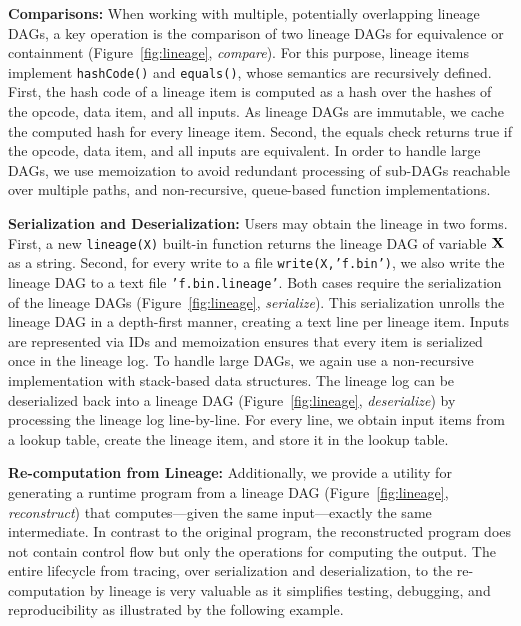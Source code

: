 \textbf{Comparisons:} When working with multiple, potentially overlapping lineage DAGs, a key operation is the comparison of two lineage DAGs for equivalence or containment (Figure~\ref{fig:lineage}, \emph{compare}). For this purpose, lineage items implement \texttt{hashCode()} and \texttt{equals()}, whose semantics are recursively defined. First, the hash code of a lineage item is computed as a hash over the hashes of the opcode, data item, and all inputs. As lineage DAGs are immutable, we cache the computed hash for every lineage item. Second, the equals check returns true if the opcode, data item, and all inputs are equivalent. In order to handle large DAGs, we use memoization to avoid redundant processing of sub-DAGs reachable over multiple paths, and non-recursive, queue-based function implementations.  

\textbf{Serialization and Deserialization:} Users may obtain the lineage in two forms. First, a new \texttt{lineage(X)} built-in function returns the lineage DAG of variable $\mathbf{X}$ as a string. Second, for every write to a file \texttt{write(X,'f.bin')}, we also write the lineage DAG to a text file \texttt{'f.bin.lineage'}. Both cases require the serialization of the lineage DAGs (Figure~\ref{fig:lineage}, \emph{serialize}). This serialization unrolls the lineage DAG in a depth-first manner, creating a text line per lineage item. Inputs are represented via IDs and memoization ensures that every item is serialized once in the lineage log. To handle large DAGs, we again use a non-recursive implementation with stack-based data structures. The lineage log can be deserialized back into a lineage DAG (Figure~\ref{fig:lineage}, \emph{deserialize}) by processing the lineage log line-by-line. For every line, we obtain input items from a lookup table, create the lineage item, and store it in the lookup table.

\textbf{Re-computation from Lineage:} Additionally, we provide a utility for generating a runtime program from a lineage DAG (Figure~\ref{fig:lineage}, \emph{reconstruct}) that computes---given the same input---exactly the same intermediate. In contrast to the original program, the reconstructed program does not contain control flow but only the operations for computing the output. The entire lifecycle from tracing, over serialization and deserialization, to the re-computation by lineage is very valuable as it simplifies testing, debugging, and reproducibility as illustrated by the following example.

